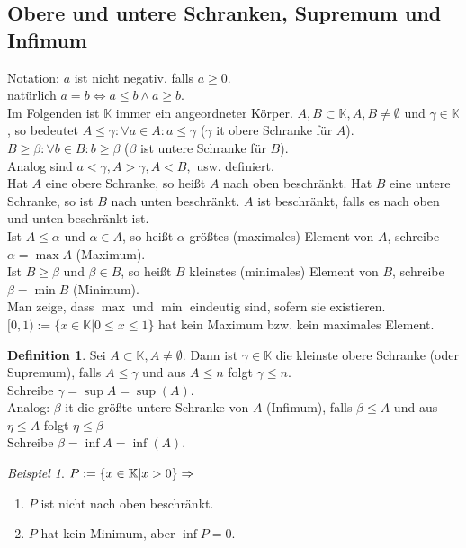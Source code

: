 \documentclass[12pt,a4paper,titlepage]{article} %
\theoremstyle{definition}
\newtheorem{defi}{Definition}[subsection]
\theoremstyle{remark}
\newtheorem*{bsp}{Beispiel}
\begin{document}
\subsection{Obere und untere Schranken, Supremum und Infimum}
Notation: $a$ ist nicht negativ, falls $a\geq 0$.
\\natürlich $a=b\Leftrightarrow a\leq b \wedge a \geq b$.\\
Im Folgenden ist $\mathbb{K}$ immer ein angeordneter Körper. $A,B \subset \mathbb{K}, A,B\neq \emptyset$ und $\gamma \in \mathbb{K}$, so bedeutet $A\leq \gamma: \forall a\in A: a \leq \gamma$ ($\gamma$ it obere Schranke für $A$).\\
$B\geq \beta: \forall b\in B: b\geq \beta$ ($\beta$ ist untere Schranke für $B$).\\
Analog sind $a<\gamma, A>\gamma, A<B,$ usw. definiert.\\
Hat $A$ eine obere Schranke, so heißt $A$ nach oben beschränkt. Hat $B$ eine untere Schranke, so ist $B$ nach unten beschränkt. $A$ ist beschränkt, falls es nach oben und unten beschränkt ist.\\
Ist $A\leq \alpha$ und $\alpha\in A$, so heißt $\alpha$ größtes (maximales) Element von $A$, schreibe $\alpha = \max A$ (Maximum).\\
Ist $B\geq \beta$ und $\beta\in B$, so heißt $B$ kleinstes (minimales) Element von $B$, schreibe $\beta = \min B$ (Minimum).\\
Man zeige, dass $\max$ und $\min$ eindeutig sind, sofern sie existieren.\\
$[0,1) := \{x\in\mathbb{K}|0\leq x\leq 1\}$ hat kein Maximum bzw. kein maximales Element.
\begin{defi}
	Sei $A\subset \mathbb{K}, A\neq \emptyset$. Dann ist $\gamma\in\mathbb{K}$ die kleinste obere Schranke (oder Supremum), falls $A\leq \gamma$ und aus $A\leq n$ folgt $\gamma \leq n$.\\
	Schreibe $\gamma = \sup A = \sup(A)$.\\
	Analog: $\beta$ it die größte untere Schranke von $A$ (Infimum), falls $\beta \leq A$ und aus $\eta \leq A$ folgt $\eta \leq \beta$\\
	Schreibe $\beta = \inf A = \inf(A)$.
\end{defi}
\begin{bsp}
	$P := \{x\in\mathbb{K}|x>0\}\\
	\Rightarrow$
	\begin{enumerate}
		\item $P$ ist nicht nach oben beschränkt.
		\item $P$ hat kein Minimum, aber $\inf P = 0$.
	\end{enumerate}
\end{bsp}
\end{document}
